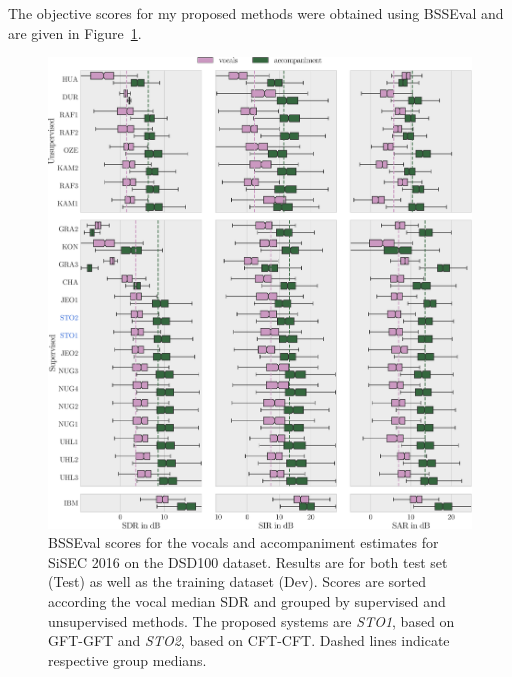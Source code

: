 The objective scores for my proposed methods were obtained using BSSEval and are given in Figure~\ref{fig:eval}.

\begin{figure}[htbp]
    \includegraphics[width=1.1\textwidth]{Chapters/06_Separation_Unknown/figures/evaluation.pdf}
    \caption{BSSEval scores for the vocals and accompaniment estimates for SiSEC 2016 on the DSD100 dataset. Results are for both test set (Test) as well as the training dataset (Dev). Scores are sorted according the vocal median SDR and grouped by supervised and unsupervised methods. The proposed systems are \emph{STO1}, based on GFT-GFT and \emph{STO2}, based on CFT-CFT. Dashed lines indicate respective group medians.}
    \label{fig:eval}
\end{figure}

